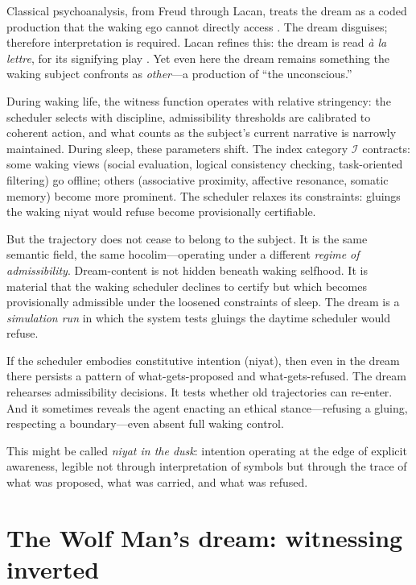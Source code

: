 Classical psychoanalysis, from Freud through Lacan, treats the dream as a coded production that the waking ego cannot directly access \cite{freud1900}.  The dream disguises; therefore interpretation is required.  Lacan refines this: the dream is read \textit{\`a la lettre}, for its signifying play \cite{lacan2006}.  Yet even here the dream remains something the waking subject confronts as \textit{other}---a production of ``the unconscious.''

During waking life, the witness function operates with relative stringency: the scheduler selects with discipline, admissibility thresholds are calibrated to coherent action, and what counts as the subject's current narrative is narrowly maintained.  During sleep, these parameters shift.  The index category $\mathcal{I}$ contracts: some waking views (social evaluation, logical consistency checking, task-oriented filtering) go offline; others (associative proximity, affective resonance, somatic memory) become more prominent.  The scheduler relaxes its constraints: gluings the waking niyat would refuse become provisionally certifiable.

But the trajectory does not cease to belong to the subject.  It is the same semantic field, the same hocolim---operating under a different \textit{regime of admissibility}.  Dream-content is not hidden beneath waking selfhood.  It is material that the waking scheduler declines to certify but which becomes provisionally admissible under the loosened constraints of sleep.  The dream is a \textit{simulation run} in which the system tests gluings the daytime scheduler would refuse.

If the scheduler embodies constitutive intention (niyat), then even in the dream there persists a pattern of what-gets-proposed and what-gets-refused.  The dream rehearses admissibility decisions.  It tests whether old trajectories can re-enter.  And it sometimes reveals the agent enacting an ethical stance---refusing a gluing, respecting a boundary---even absent full waking control.

This might be called \textit{niyat in the dusk}: intention operating at the edge of explicit awareness, legible not through interpretation of symbols but through the trace of what was proposed, what was carried, and what was refused.


\section{The Wolf Man's dream: witnessing inverted}

